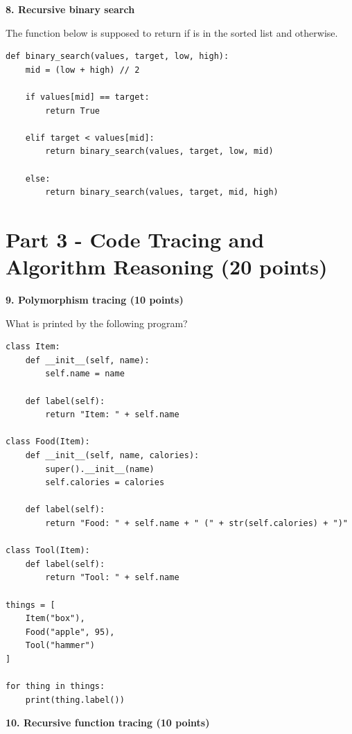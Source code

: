 \documentclass[11pt]{article}
\newcommand{\code}[1]{\texttt{\detokenize{#1}}}
\begin{document}
\vspace{2.2in}

\newpage

\textbf{8. Recursive binary search}

The function below is supposed to return \code{True} if \code{target} is in the sorted list and \code{False} otherwise.

\begin{verbatim}
def binary_search(values, target, low, high):
    mid = (low + high) // 2

    if values[mid] == target:
        return True

    elif target < values[mid]:
        return binary_search(values, target, low, mid)

    else:
        return binary_search(values, target, mid, high)
\end{verbatim}

\vspace{3.0in}

\newpage

\section*{Part 3 - Code Tracing and Algorithm Reasoning (20 points)}

\textbf{9. Polymorphism tracing (10 points)}

What is printed by the following program?

\begin{verbatim}
class Item:
    def __init__(self, name):
        self.name = name

    def label(self):
        return "Item: " + self.name

class Food(Item):
    def __init__(self, name, calories):
        super().__init__(name)
        self.calories = calories

    def label(self):
        return "Food: " + self.name + " (" + str(self.calories) + ")"

class Tool(Item):
    def label(self):
        return "Tool: " + self.name

things = [
    Item("box"),
    Food("apple", 95),
    Tool("hammer")
]

for thing in things:
    print(thing.label())
\end{verbatim}

\vspace{2.5in}

\newpage

\textbf{10. Recursive function tracing (10 points)}
\end{document}
